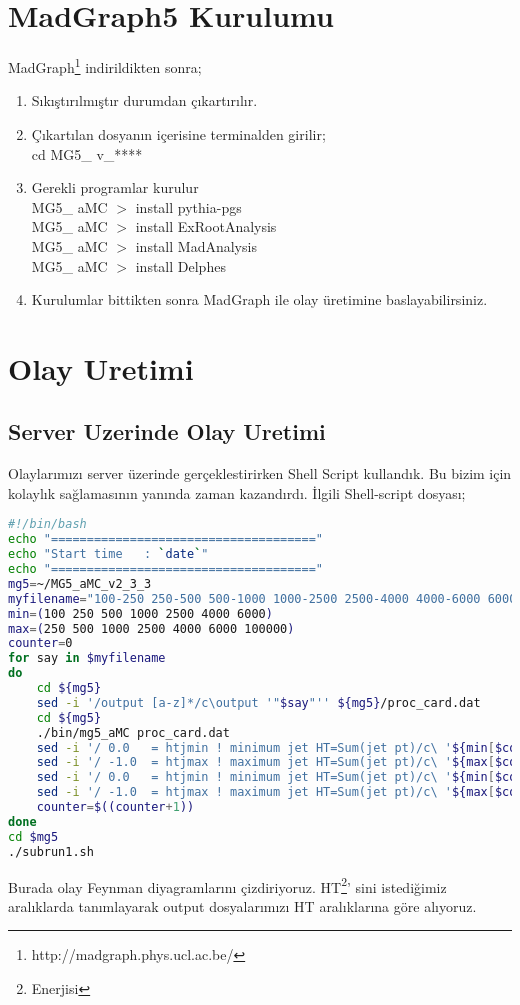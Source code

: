 \section{MadGraph5 Kurulumu}
MadGraph\footnote{http://madgraph.phys.ucl.ac.be/} indirildikten sonra;
\begin{enumerate}
\item Sıkıştırılmıştır durumdan çıkartırılır.
\item Çıkartılan dosyanın içerisine terminalden girilir;\\
cd MG5\_ v\_****
\item  Gerekli programlar kurulur \\
MG5\_ aMC $>$ install pythia-pgs \\
MG5\_ aMC $>$ install ExRootAnalysis \\
MG5\_ aMC $>$ install MadAnalysis \\
MG5\_ aMC $>$ install Delphes 
\item Kurulumlar bittikten sonra MadGraph ile olay üretimine baslayabilirsiniz.
\end{enumerate}
\section{Olay Uretimi}
\subsection{Server Uzerinde Olay Uretimi}
Olaylarımızı server üzerinde gerçeklestirirken Shell Script kullandık. Bu bizim için kolaylık sağlamasının yanında zaman kazandırdı. İlgili Shell-script dosyası;

\begin{lstlisting}[language=bash,caption={Feynman diyagramlari ciziliyor}]
#!/bin/bash
echo "====================================="
echo "Start time   : `date`"
echo "====================================="
mg5=~/MG5_aMC_v2_3_3
myfilename="100-250 250-500 500-1000 1000-2500 2500-4000 4000-6000 6000-Inf"
min=(100 250 500 1000 2500 4000 6000)
max=(250 500 1000 2500 4000 6000 100000)
counter=0
for say in $myfilename
do
	cd ${mg5}
	sed -i '/output [a-z]*/c\output '"$say"'' ${mg5}/proc_card.dat
	cd ${mg5}
	./bin/mg5_aMC proc_card.dat
	sed -i '/ 0.0   = htjmin ! minimum jet HT=Sum(jet pt)/c\ '${min[$counter]}'   = htjmin ! minimum jet HT=Sum(jet pt)' ${mg5}/$say/Cards/run_card.dat
	sed -i '/ -1.0  = htjmax ! maximum jet HT=Sum(jet pt)/c\ '${max[$counter]}'   = htjmax ! maximum jet HT=Sum(jet pt)' ${mg5}/$say/Cards/run_card.dat
	sed -i '/ 0.0   = htjmin ! minimum jet HT=Sum(jet pt)/c\ '${min[$counter]}'   = htjmin ! minimum jet HT=Sum(jet pt)' ${mg5}/$say/Cards/run_card_default.dat
	sed -i '/ -1.0  = htjmax ! maximum jet HT=Sum(jet pt)/c\ '${max[$counter]}'   = htjmax ! maximum jet HT=Sum(jet pt)' ${mg5}/$say/Cards/run_card_default.dat
	counter=$((counter+1))
done
cd $mg5
./subrun1.sh
\end{lstlisting}
Burada olay Feynman diyagramlarını çizdiriyoruz. HT\footnote{Enerjisi}' sini istediğimiz aralıklarda tanımlayarak output dosyalarımızı HT aralıklarına göre alıyoruz.

